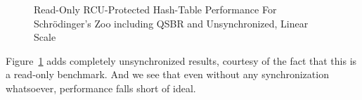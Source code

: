 \begin{figure}[tb]
\centering
{}
\caption{Read-Only RCU-Protected Hash-Table Performance For Schr\"odinger's Zoo including QSBR and Unsynchronized, Linear Scale}
\label{fig:datastruct:Read-Only RCU-Protected Hash-Table Performance For Schroedinger's Zoo including QSBR and Unsynchronized, Linear Scale}
\end{figure}

Figure~\ref{fig:datastruct:Read-Only RCU-Protected Hash-Table Performance For Schroedinger's Zoo including QSBR and Unsynchronized, Linear Scale}
adds completely unsynchronized results, courtesy of the fact that this
is a read-only benchmark.
And we see that even without any synchronization whatsoever, performance
falls short of ideal.

